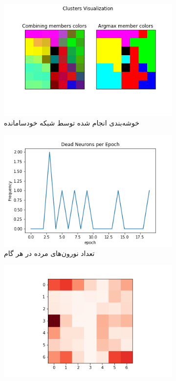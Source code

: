 \documentclass[12pt, a4paper]{article}
\begin{document}
\clearpage

\begin{figure}[h]
    \begin{subfigure}{\linewidth}
        \centering
        \includegraphics[width=0.8\linewidth]{images/q5/r4/cluster.png}
        \caption{خوشه‌بندی انجام شده توسط شبکه خودسامانده}
    \end{subfigure}
    \newline
    \begin{subfigure}{0.45\linewidth}
        \includegraphics[width=\linewidth]{images/q5/r4/dead.png}
        \caption{تعداد نورون‌های مرده در هر گام}
    \end{subfigure}
    \hfill
    \begin{subfigure}{0.45\linewidth}
        \includegraphics[width=\linewidth]{images/q5/r4/umatrix.png}

\end{subfigure}
\end{figure}
\end{document}
